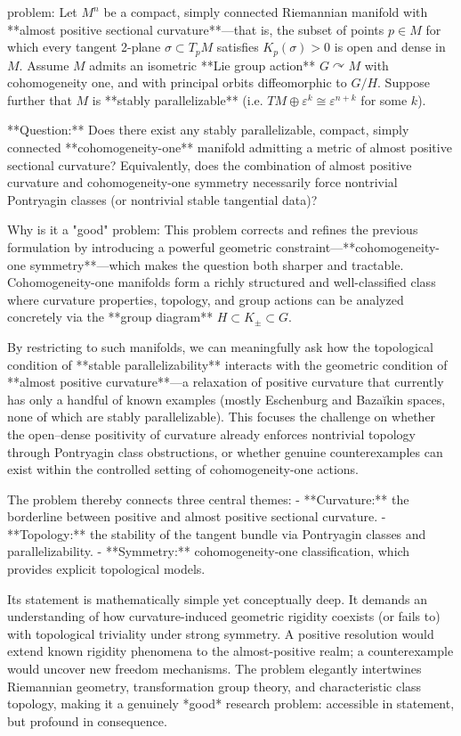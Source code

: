 problem:  
Let \( M^{n} \) be a compact, simply connected Riemannian manifold with **almost positive sectional curvature**—that is, the subset of points \( p \in M \) for which every tangent 2-plane \( \sigma \subset T_pM \) satisfies \( K_p(\sigma) > 0 \) is open and dense in \( M \).  
Assume \( M \) admits an isometric **Lie group action** \( G \curvearrowright M \) with cohomogeneity one, and with principal orbits diffeomorphic to \( G/H \). Suppose further that \( M \) is **stably parallelizable** (i.e. \( TM \oplus \varepsilon^k \cong \varepsilon^{n+k} \) for some \( k \)).  

**Question:**  
Does there exist any stably parallelizable, compact, simply connected **cohomogeneity-one** manifold admitting a metric of almost positive sectional curvature?  
Equivalently, does the combination of almost positive curvature and cohomogeneity-one symmetry necessarily force nontrivial Pontryagin classes (or nontrivial stable tangential data)?  

Why is it a "good" problem:  
This problem corrects and refines the previous formulation by introducing a powerful geometric constraint—**cohomogeneity-one symmetry**—which makes the question both sharper and tractable. Cohomogeneity-one manifolds form a richly structured and well-classified class where curvature properties, topology, and group actions can be analyzed concretely via the **group diagram** \( H \subset K_\pm \subset G \).  

By restricting to such manifolds, we can meaningfully ask how the topological condition of **stable parallelizability** interacts with the geometric condition of **almost positive curvature**—a relaxation of positive curvature that currently has only a handful of known examples (mostly Eschenburg and Bazaĭkin spaces, none of which are stably parallelizable).  This focuses the challenge on whether the open–dense positivity of curvature already enforces nontrivial topology through Pontryagin class obstructions, or whether genuine counterexamples can exist within the controlled setting of cohomogeneity-one actions.  

The problem thereby connects three central themes:
- **Curvature:** the borderline between positive and almost positive sectional curvature.  
- **Topology:** the stability of the tangent bundle via Pontryagin classes and parallelizability.  
- **Symmetry:** cohomogeneity-one classification, which provides explicit topological models.  

Its statement is mathematically simple yet conceptually deep. It demands an understanding of how curvature-induced geometric rigidity coexists (or fails to) with topological triviality under strong symmetry. A positive resolution would extend known rigidity phenomena to the almost-positive realm; a counterexample would uncover new freedom mechanisms. The problem elegantly intertwines Riemannian geometry, transformation group theory, and characteristic class topology, making it a genuinely *good* research problem: accessible in statement, but profound in consequence.